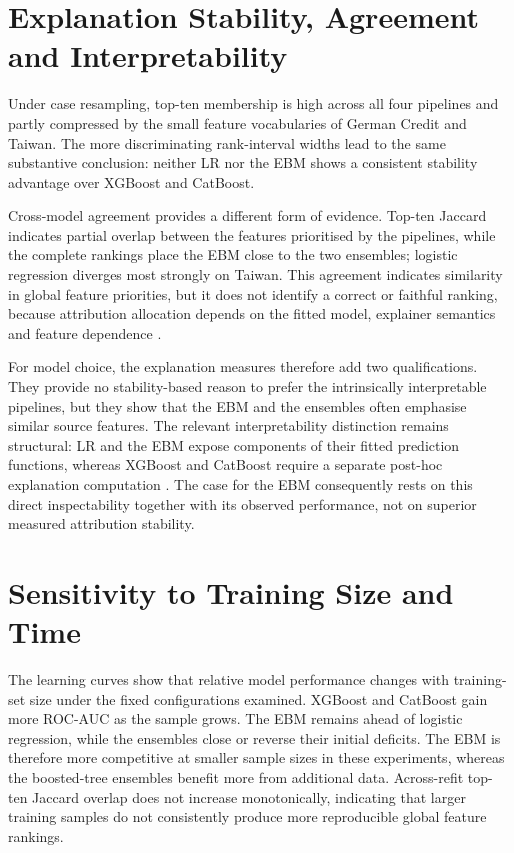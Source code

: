 \section{Explanation Stability, Agreement and Interpretability}

Under case resampling, top-ten membership is high across all four pipelines and partly
compressed by the small feature vocabularies of German Credit and Taiwan. The more
discriminating rank-interval widths lead to the same substantive conclusion: neither LR
nor the EBM shows a consistent stability advantage over XGBoost and CatBoost.

Cross-model agreement provides a different form of evidence. Top-ten Jaccard indicates
partial overlap between the features prioritised by the pipelines, while the complete
rankings place the EBM close to the two ensembles; logistic regression diverges most
strongly on Taiwan. This agreement indicates similarity in global feature priorities,
but it does not identify a correct or faithful ranking, because attribution allocation
depends on the fitted model, explainer semantics and feature dependence
\citep{aasExplainingIndividualPredictions2021}.

For model choice, the explanation measures therefore add two qualifications. They
provide no stability-based reason to prefer the intrinsically interpretable pipelines,
but they show that the EBM and the ensembles often emphasise similar source features.
The relevant interpretability distinction remains structural: LR and the EBM expose
components of their fitted prediction functions, whereas XGBoost and CatBoost require a
separate post-hoc explanation computation
\citep{rudinStopExplainingBlack2019a}. The case for the EBM consequently rests on this
direct inspectability together with its observed performance, not on superior measured
attribution stability.


\section{Sensitivity to Training Size and Time}

The learning curves show that relative model performance changes with training-set
size under the fixed configurations examined. XGBoost and CatBoost gain more
ROC-AUC as the sample grows. The EBM remains ahead of logistic regression, while
the ensembles close or reverse their initial deficits. The EBM is therefore more
competitive at smaller sample sizes in these experiments, whereas the boosted-tree
ensembles benefit more from additional data. Across-refit top-ten Jaccard overlap
does not increase monotonically, indicating that larger training samples do not
consistently produce more reproducible global feature rankings.

